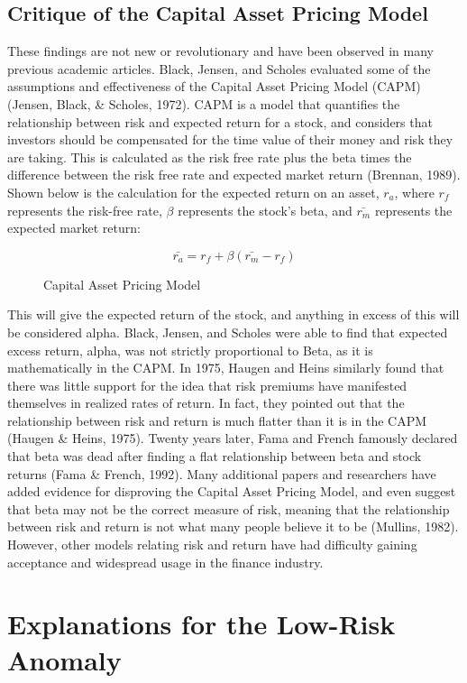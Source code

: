 \documentclass[12pt,twoside]{reedthesis}
\theoremstyle{definition}
\theoremstyle{definition}
\theoremstyle{definition}
\theoremstyle{remark}
\begin{document}
\subsection{Critique of the Capital Asset Pricing
Model}\label{critique-of-the-capital-asset-pricing-model}

These findings are not new or revolutionary and have been observed in
many previous academic articles. Black, Jensen, and Scholes evaluated
some of the assumptions and effectiveness of the Capital Asset Pricing
Model (CAPM) (Jensen, Black, \& Scholes, 1972). CAPM is a model that
quantifies the relationship between risk and expected return for a
stock, and considers that investors should be compensated for the time
value of their money and risk they are taking. This is calculated as the
risk free rate plus the beta times the difference between the risk free
rate and expected market return (Brennan, 1989). Shown below is the
calculation for the expected return on an asset, \(r_a\), where \(r_f\)
represents the risk-free rate, \(\beta\) represents the stock's beta,
and \(\bar{r_m}\) represents the expected market return:
\begin{figure}
$$ \bar{r_a} = r_f + \beta(\bar{r_m}-r_f)$$
\caption{Capital Asset Pricing Model}
\end{figure}
This will give the expected return of the stock, and anything in excess
of this will be considered alpha. Black, Jensen, and Scholes were able
to find that expected excess return, alpha, was not strictly
proportional to Beta, as it is mathematically in the CAPM. In 1975,
Haugen and Heins similarly found that there was little support for the
idea that risk premiums have manifested themselves in realized rates of
return. In fact, they pointed out that the relationship between risk and
return is much flatter than it is in the CAPM (Haugen \& Heins, 1975).
Twenty years later, Fama and French famously declared that beta was dead
after finding a flat relationship between beta and stock returns (Fama
\& French, 1992). Many additional papers and researchers have added
evidence for disproving the Capital Asset Pricing Model, and even
suggest that beta may not be the correct measure of risk, meaning that
the relationship between risk and return is not what many people believe
it to be (Mullins, 1982). However, other models relating risk and return
have had difficulty gaining acceptance and widespread usage in the
finance industry.

\section{Explanations for the Low-Risk
Anomaly}\label{explanations-for-the-low-risk-anomaly}
\end{document}
